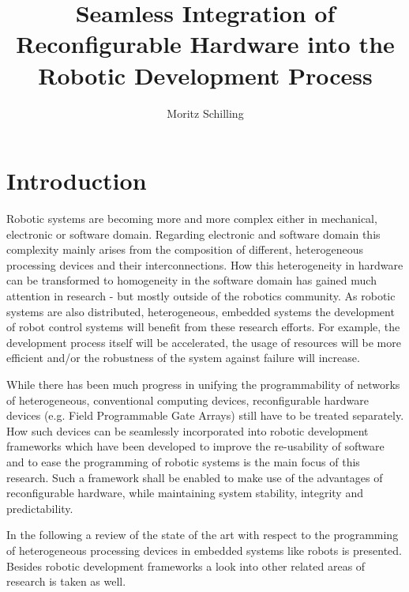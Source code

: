 \documentclass[a4paper,twocolumn]{esapub2005} %
\title{Seamless Integration of Reconfigurable Hardware into the Robotic Development Process}
\author{Moritz Schilling}
\affil{DFKI GmbH, Robert-Hooke-Str. 5, 28359 Bremen, Germany}
\affil{TEC-MMA, ESTEC, 2200 AG Noordwijk, The Netherlands}
\begin{document}
\maketitle




\section{Introduction}

Robotic systems are becoming more and more complex either in mechanical, electronic or software domain.
Regarding electronic and software domain this complexity mainly arises from the composition of different, heterogeneous processing devices and their interconnections.
How this heterogeneity in hardware can be transformed to homogeneity in the software domain has gained much attention in research - but mostly outside of the robotics community.
As robotic systems are also distributed, heterogeneous, embedded systems the development of robot control systems will benefit from these research efforts.
For example, the development process itself will be accelerated, the usage of resources will be more efficient and/or the robustness of the system against failure will increase.

While there has been much progress in unifying the programmability of networks of heterogeneous, conventional computing devices,
reconfigurable hardware devices (e.g. Field Programmable Gate Arrays) still have to be treated separately.
How such devices can be seamlessly incorporated into robotic development frameworks which have been developed to improve the re-usability of software and to ease the programming of robotic systems is the main focus of this research.
Such a framework shall be enabled to make use of the advantages of reconfigurable hardware, while maintaining system stability, integrity and predictability.

In the following a review of the state of the art with respect to the programming of heterogeneous processing devices in embedded systems like robots is presented. Besides robotic development frameworks a look into other related areas of research is taken as well.
\end{document}
